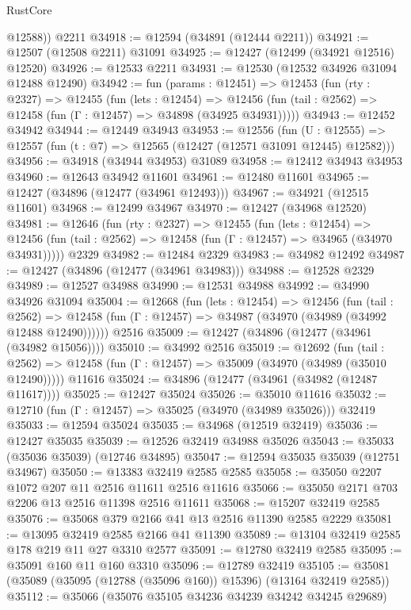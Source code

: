 \begin{lexlean}{RustCore}
\begin{coremodule}
        @12588))
    @2211
@34918 := @12594 (@34891 (@12444 @2211))
@34921 := @12507 (@12508 @2211) @31091
@34925 := @12427 (@12499 (@34921 @12516) @12520)
@34926 := @12533 @2211
@34931 := @12530 (@12532 @34926 @31094 @12488 @12490)
@34942 := fun (params : @12451) =>
  @12453
    (fun (rty : @2327) =>
    @12455
      (fun (lets : @12454) =>
      @12456 (fun (tail : @2562) => @12458 (fun (Γ : @12457) => @34898 (@34925 @34931)))))
@34943 := @12452 @34942
@34944 := @12449 @34943
@34953 := @12556
    (fun (U : @12555) => @12557 (fun (t : @7) => @12565 (@12427 (@12571 @31091 @12445) @12582)))
@34956 := @34918 (@34944 @34953) @31089
@34958 := @12412 @34943 @34953
@34960 := @12643 @34942 @11601
@34961 := @12480 @11601
@34965 := @12427 (@34896 (@12477 (@34961 @12493)))
@34967 := @34921 (@12515 @11601)
@34968 := @12499 @34967
@34970 := @12427 (@34968 @12520)
@34981 := @12646
    (fun (rty : @2327) =>
    @12455
      (fun (lets : @12454) =>
      @12456 (fun (tail : @2562) => @12458 (fun (Γ : @12457) => @34965 (@34970 @34931)))))
    @2329
@34982 := @12484 @2329
@34983 := @34982 @12492
@34987 := @12427 (@34896 (@12477 (@34961 @34983)))
@34988 := @12528 @2329
@34989 := @12527 @34988
@34990 := @12531 @34988
@34992 := @34990 @34926 @31094
@35004 := @12668
    (fun (lets : @12454) =>
    @12456
      (fun (tail : @2562) =>
      @12458 (fun (Γ : @12457) => @34987 (@34970 (@34989 (@34992 @12488 @12490))))))
    @2516
@35009 := @12427 (@34896 (@12477 (@34961 (@34982 @15056))))
@35010 := @34992 @2516
@35019 := @12692
    (fun (tail : @2562) => @12458 (fun (Γ : @12457) => @35009 (@34970 (@34989 (@35010 @12490)))))
    @11616
@35024 := @34896 (@12477 (@34961 (@34982 (@12487 @11617))))
@35025 := @12427 @35024
@35026 := @35010 @11616
@35032 := @12710 (fun (Γ : @12457) => @35025 (@34970 (@34989 @35026))) @32419
@35033 := @12594 @35024
@35035 := @34968 (@12519 @32419)
@35036 := @12427 @35035
@35039 := @12526 @32419 @34988 @35026
@35043 := @35033 (@35036 @35039) (@12746 @34895)
@35047 := @12594 @35035 @35039 (@12751 @34967)
@35050 := @13383 @32419 @2585 @2585
@35058 := @35050 @2207 @1072 @207 @11 @2516 @11611 @2516 @11616
@35066 := @35050 @2171 @703 @2206 @13 @2516 @11398 @2516 @11611
@35068 := @15207 @32419 @2585
@35076 := @35068 @379 @2166 @41 @13 @2516 @11390 @2585 @2229
@35081 := @13095 @32419 @2585 @2166 @41 @11390
@35089 := @13104 @32419 @2585 @178 @219 @11 @27 @3310 @2577
@35091 := @12780 @32419 @2585
@35095 := @35091 @160 @11 @160 @3310
@35096 := @12789 @32419
@35105 := @35081 (@35089 (@35095 (@12788 (@35096 @160)) @15396) (@13164 @32419 @2585))
@35112 := @35066 (@35076 @35105 @34236 @34239 @34242 @34245 @29689)

\end{coremodule}
\end{lexlean}
